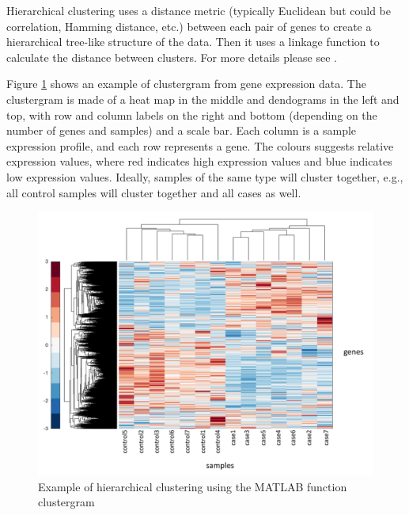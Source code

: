 \documentclass[11pt, oneside]{article}   	%
\begin{document}
Hierarchical clustering uses a distance metric (typically Euclidean but could be correlation, Hamming distance, etc.) between each pair of genes to create a hierarchical tree-like structure of the data. Then it uses a linkage function to calculate the distance between clusters. For more details please see \cite{Clustergram}. 


Figure \ref{fig:hierarchical-clustering} shows an example of clustergram from gene expression data.
The clustergram is made of a heat map in the middle and dendograms in the left and top, with row and column labels on the right and bottom (depending on the number of genes and samples) and a scale bar. 
Each column is a sample expression profile, and each row represents a gene.
The colours suggests relative expression values, where red indicates high expression values and blue indicates low expression values. 
Ideally, samples of the same type will cluster together, e.g., all control samples will cluster together and all cases as well.

\begin{figure}[!h]
	\includegraphics[width=\textwidth]{hierarchical-clustering}
	\caption{Example of hierarchical clustering using the MATLAB function clustergram}
	\label{fig:hierarchical-clustering}
\end{figure}


\end{document}
